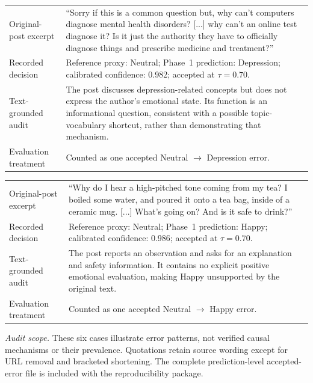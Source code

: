 \documentclass{ieeeaccess}
\begin{document}
\par\medskip
\noindent\begin{tabularx}{\textwidth}{@{}>{\raggedright\arraybackslash}p{}Y@{}}
\toprule
{} \\
\midrule
Original-post excerpt & ``Sorry if this is a common question but, why can't computers diagnose mental health disorders? [...] why can't an online test diagnose it? Is it just the authority they have to officially diagnose things and prescribe medicine and treatment?'' \\
Recorded decision & Reference proxy: Neutral; Phase~1 prediction: Depression; calibrated confidence: 0.982; accepted at $\tau=0.70$. \\
Text-grounded audit & The post discusses depression-related concepts but does not express the author's emotional state. Its function is an informational question, consistent with a possible topic-vocabulary shortcut, rather than demonstrating that mechanism. \\
Evaluation treatment & Counted as one accepted Neutral $\rightarrow$ Depression error. \\
\bottomrule
\end{tabularx}

\noindent\begin{tabularx}{\textwidth}{@{}>{\raggedright\arraybackslash}p{}Y@{}}
\toprule
{} \\
\midrule
Original-post excerpt & ``Why do I hear a high-pitched tone coming from my tea? I boiled some water, and poured it onto a tea bag, inside of a ceramic mug. [...] What's going on? And is it safe to drink?'' \\
Recorded decision & Reference proxy: Neutral; Phase~1 prediction: Happy; calibrated confidence: 0.986; accepted at $\tau=0.70$. \\
Text-grounded audit & The post reports an observation and asks for an explanation and safety information. It contains no explicit positive emotional evaluation, making Happy unsupported by the original text. \\
Evaluation treatment & Counted as one accepted Neutral $\rightarrow$ Happy error. \\
\bottomrule
\end{tabularx}

\par\smallskip
\noindent\footnotesize\textit{Audit scope.} These six cases illustrate error patterns, not verified causal mechanisms or their prevalence. Quotations retain source wording except for URL removal and bracketed shortening. The complete prediction-level accepted-error file is included with the reproducibility package.\normalsize
\end{document}

